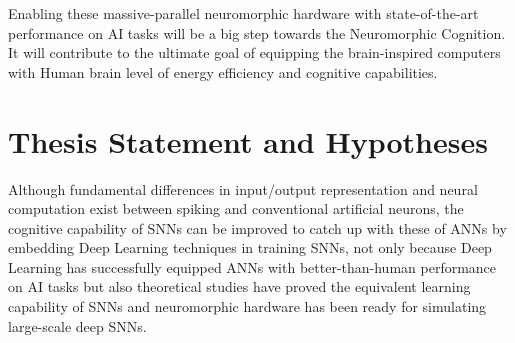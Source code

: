 
Enabling these massive-parallel neuromorphic hardware with state-of-the-art performance on AI tasks will be a big step towards the Neuromorphic Cognition.
It will contribute to the ultimate goal of equipping the brain-inspired computers with Human brain level of energy efficiency and cognitive capabilities. 


\section{Thesis Statement and Hypotheses}
\label{sec:aim}
Although fundamental differences in input/output representation and neural computation exist between spiking and conventional artificial neurons, the cognitive capability of SNNs can be improved to catch up with these of ANNs by embedding Deep Learning techniques in training SNNs, not only because Deep Learning has successfully equipped ANNs with better-than-human performance on AI tasks but also theoretical studies have proved the equivalent learning capability of SNNs and neuromorphic hardware has been ready for simulating large-scale deep SNNs.

